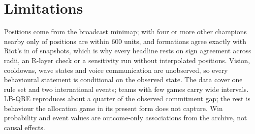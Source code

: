 \section{Limitations}
\label{sec:limitations}

Positions come from the broadcast minimap; with four or more other champions nearby only  of positions are within 600 units, and formations agree exactly with Riot's in  of snapshots, which is why every headline rests on sign agreement across radii, an R-layer check or a sensitivity run without interpolated positions.
Vision, cooldowns, wave states and voice communication are unobserved, so every behavioural statement is conditional on the observed state.
The data cover one rule set and two international events; teams with few games carry wide intervals.
LB-QRE reproduces about a quarter of the observed commitment gap; the rest is behaviour the allocation game in its present form does not capture.
Win probability and event values are outcome-only associations from the archive, not causal effects.
